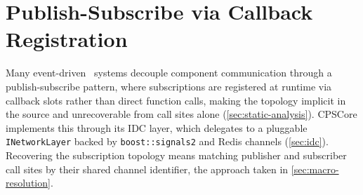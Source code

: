 \section{Publish-Subscribe via Callback Registration}\label{sec:pubsub-background}

Many event-driven \Cpp\ systems decouple component communication through
a publish-subscribe pattern, where subscriptions are registered at
runtime via callback slots rather than direct function calls, making the
topology implicit in the source and unrecoverable from call sites alone
(\cref{sec:static-analysis}). CPSCore implements this through its
\ac{IDC} layer, which delegates to a pluggable \texttt{INetworkLayer}
backed by \texttt{boost::signals2} and Redis channels
(\cref{sec:idc}). Recovering the subscription topology means matching
publisher and subscriber call sites by their shared channel identifier,
the approach taken in \cref{sec:macro-resolution}.

